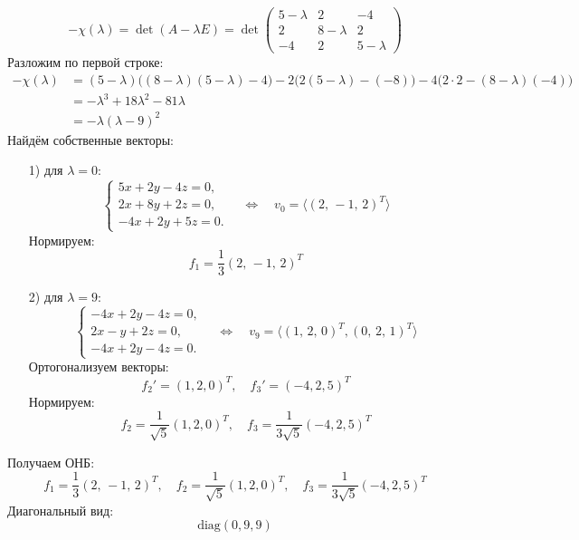 \documentclass[a4paper]{article}
\renewcommand{\f}[2]{\frac{#1}{#2}}
\newcommand{\lr}{\Leftrightarrow}
\begin{document}
\begin{enumerate}
  $$
  -\chi(\lambda)=\det(A-\lambda E)
  =\det\begin{pmatrix}
  5-\lambda & 2 & -4\\
  2 & 8-\lambda & 2\\
  -4 & 2 & 5-\lambda
  \end{pmatrix}
  $$
  Разложим по первой строке:
  $$
  \begin{aligned}
  -\chi(\lambda)&=(5-\lambda)\bigl((8-\lambda)(5-\lambda)-4\bigr)
  -2\bigl(2(5-\lambda)-(-8)\bigr)
  -4\bigl(2\cdot2-(8-\lambda)(-4)\bigr)\\
  &=-\lambda^3+18\lambda^2-81\lambda\\
  &=-\lambda(\lambda-9)^2
  \end{aligned}
  $$
  Найдём собственные векторы:
  \begin{enumerate}
    \item[1)]для $\lambda=0$:\\
    $$
    \begin{cases}
    5x+2y-4z=0,\\
    2x+8y+2z=0,\\
    -4x+2y+5z=0.
    \end{cases}
    \quad \lr \quad v_{0}=\langle (2,\,-1,\,2)^T \rangle$$
    Нормируем:
    $$f_1 = \f{1}{3} (2,\,-1,\,2)^T $$

    \item[2)]для $\lambda=9$:\\
    $$
    \begin{cases}
    -4x+2y-4z=0,\\
    2x-y+2z=0,\\
    -4x+2y-4z=0.
    \end{cases}
    \quad \lr \quad 
    v_{9}=\langle (1,\,2,\,0)^T, (0,\,2,\,1)^T \rangle$$
    Ортогонализуем векторы:
    $$f_2' = (1, 2, 0)^T, \quad f_3' = (-4,2,5)^T$$
    Нормируем:
    $$f_2 = \f{1}{\sqrt{5}}(1, 2, 0)^T, \quad f_3 = \f{1}{3\sqrt{5}}(-4,2,5)^T$$
  \end{enumerate}
  Получаем ОНБ:
  $$f_1 = \f{1}{3} (2,\,-1,\,2)^T,\quad f_2 = \f{1}{\sqrt{5}}(1, 2, 0)^T, \quad f_3 = \f{1}{3\sqrt{5}}(-4,2,5)^T$$
  Диагональный вид:
  $$\text{diag}(0, 9, 9)$$\\


\end{enumerate}
\end{document}
